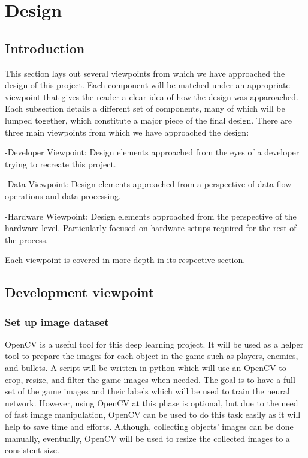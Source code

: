 \documentclass{scrreprt}
\begin{document}
\chapter{Design}

\section{Introduction}

This section lays out several viewpoints from which we have approached the design of this project.
Each component will be matched under an appropriate viewpoint that gives the reader a clear idea of how the design was apparoached.
Each subsection details a different set of components, many of which will be lumped together, which constitute a major piece of the final design.
There are three main viewpoints from which we have approached the design:

	-Developer Viewpoint: Design elements approached from the eyes of a developer trying to recreate this project.
	
	-Data Viewpoint: Design elements approached from a perspective of data flow operations and data processing.
	
	-Hardware Wiewpoint: Design elements approached from the perspective of the hardware level. Particularly focused on hardware setups required for the rest of the process.
	
Each viewpoint is covered in more depth in its respective section. 

\section{Development viewpoint}%

\subsection{Set up image dataset}%

OpenCV is a useful tool for this deep learning project.
It will be used as a helper tool to prepare the images for each object in the game such as players, enemies, and bullets.
A script will be written in python which will use an OpenCV to crop, resize, and filter the game images when needed.
The goal is to have a full set of the game images and their labels which will be used to train the neural network.
However, using OpenCV at this phase is optional, but due to the need of fast image manipulation, OpenCV can be used to do this task easily as it will help to save time and efforts.
Although, collecting objects’ images can be done manually, eventually, OpenCV will be used to resize the collected images to a consistent size.
\end{document}
